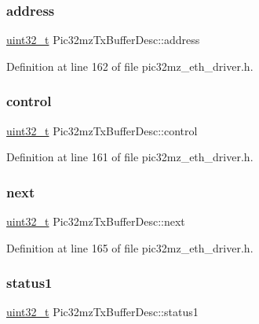 \subsubsection{\texorpdfstring{address}{address}}
{\footnotesize\ttfamily \hyperlink{stdint_8h_a435d1572bf3f880d55459d9805097f62}{uint32\+\_\+t} Pic32mz\+Tx\+Buffer\+Desc\+::address}



Definition at line 162 of file pic32mz\+\_\+eth\+\_\+driver.\+h.

\mbox{\label{structPic32mzTxBufferDesc_abcb8135aadb503621ad36e2caf44739d}} 
\subsubsection{\texorpdfstring{control}{control}}
{\footnotesize\ttfamily \hyperlink{stdint_8h_a435d1572bf3f880d55459d9805097f62}{uint32\+\_\+t} Pic32mz\+Tx\+Buffer\+Desc\+::control}



Definition at line 161 of file pic32mz\+\_\+eth\+\_\+driver.\+h.

\mbox{\label{structPic32mzTxBufferDesc_a599f7ed90daa9438a6e9156951d444ef}} 
\subsubsection{\texorpdfstring{next}{next}}
{\footnotesize\ttfamily \hyperlink{stdint_8h_a435d1572bf3f880d55459d9805097f62}{uint32\+\_\+t} Pic32mz\+Tx\+Buffer\+Desc\+::next}



Definition at line 165 of file pic32mz\+\_\+eth\+\_\+driver.\+h.

\mbox{\label{structPic32mzTxBufferDesc_a8e5fb7f2100ac5107e55b6658136f2c5}} 
\subsubsection{\texorpdfstring{status1}{status1}}
{\footnotesize\ttfamily \hyperlink{stdint_8h_a435d1572bf3f880d55459d9805097f62}{uint32\+\_\+t} Pic32mz\+Tx\+Buffer\+Desc\+::status1}




